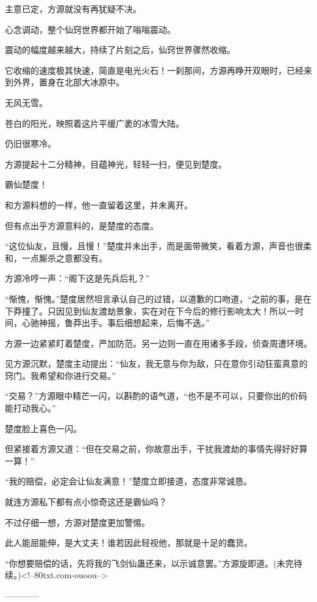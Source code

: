 \begin{this_body}
主意已定，方源就没有再犹疑不决。

心念调动，整个仙窍世界都开始了嗡嗡震动。

震动的幅度越来越大，持续了片刻之后，仙窍世界骤然收缩。

它收缩的速度极其快速，简直是电光火石！一刹那间，方源再睁开双眼时，已经来到外界，置身在北部大冰原中。

无风无雪。

苍白的阳光，映照着这片平缓广袤的冰雪大陆。

仍旧很寒冷。

方源提起十二分精神，目蕴神光，轻轻一扫，便见到楚度。

霸仙楚度！

和方源料想的一样，他一直留着这里，并未离开。

但有点出乎方源意料的，是楚度的态度。

“这位仙友，且慢，且慢！”楚度并未出手，而是面带微笑，看着方源，声音也很柔和，一点厮杀之意都没有。

方源冷哼一声：“阁下这是先兵后礼？”

“惭愧，惭愧。”楚度居然坦言承认自己的过错，以道歉的口吻道，“之前的事，是在下莽撞了。只因见到仙友渡劫景象，实在对在下今后的修行影响太大！所以一时间，心驰神摇，鲁莽出手。事后细想起来，后悔不迭。”

方源一边紧紧盯着楚度，严加防范。另一边则一直在用诸多手段，侦查周遭环境。

见方源沉默，楚度主动提出：“仙友，我无意与你为敌，只在意你引动狂蛮真意的窍门。我希望和你进行交易。”

“交易？”方源眼中精芒一闪，以斟酌的语气道，“也不是不可以，只要你出的价码能打动我心。”

楚度脸上喜色一闪。

但紧接着方源又道：“但在交易之前，你故意出手，干扰我渡劫的事情先得好好算一算！”

“我的赔偿，必定会让仙友满意！”楚度立即接道，态度非常诚恳。

就连方源私下都有点小惊奇这还是霸仙吗？

不过仔细一想，方源对楚度更加警惕。

此人能屈能伸，是大丈夫！谁若因此轻视他，那就是十足的蠢货。

“你想要赔偿的话，先将我的飞剑仙蛊还来，以示诚意罢。”方源旋即道。(未完待续。)<!--80txt.com-ouoou-->

------------

\end{this_body}

